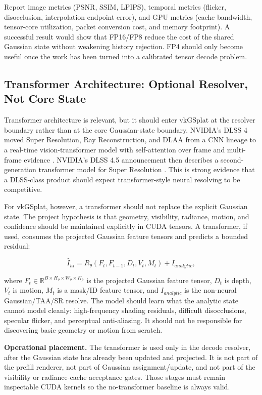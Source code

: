 \documentclass[11pt]{article}
\begin{document}
Report image metrics (PSNR, SSIM, LPIPS), temporal metrics (flicker,
disocclusion, interpolation endpoint error), and GPU metrics (cache bandwidth,
tensor-core utilization, packet conversion cost, and memory footprint). A
successful result would show that FP16/FP8 reduce the cost of the shared
Gaussian state without weakening history rejection. FP4 should only become
useful once the work has been turned into a calibrated tensor decode problem.

\subsection{Transformer Architecture: Optional Resolver, Not Core State}

Transformer architecture is relevant, but it should enter vkGSplat at the
resolver boundary rather than at the core Gaussian-state boundary. NVIDIA's
DLSS 4 moved Super Resolution, Ray Reconstruction, and DLAA from a CNN lineage
to a real-time vision-transformer model with self-attention over frame and
multi-frame evidence \cite{nvidia2025dlss4}. NVIDIA's DLSS 4.5 announcement
then describes a second-generation transformer model for Super Resolution
\cite{nvidia2026dlss45,nvidia2026dlssdeveloper}. This is strong evidence that
a DLSS-class product should expect transformer-style neural resolving to be
competitive.

For vkGSplat, however, a transformer should not replace the explicit Gaussian
state. The project hypothesis is that geometry, visibility, radiance, motion,
and confidence should be maintained explicitly in CUDA tensors. A transformer,
if used, consumes the projected Gaussian feature tensors and predicts a bounded
residual:

\[
  \hat I_{hi} = R_\theta(F_t, F_{t-1}, D_t, V_t, M_t) + I_{analytic},
\]

where $F_t\in\mathbb{R}^{B\times H_o\times W_o\times K_p}$ is the projected
Gaussian feature tensor, $D_t$ is depth, $V_t$ is motion, $M_t$ is a mask/ID
feature tensor, and $I_{analytic}$ is the non-neural Gaussian/TAA/SR resolve.
The model should learn what the analytic state cannot model cleanly:
high-frequency shading residuals, difficult disocclusions, specular flicker,
and perceptual anti-aliasing. It should not be responsible for discovering
basic geometry or motion from scratch.

\textbf{Operational placement.} The transformer is used only in the decode
resolver, after the Gaussian state has already been updated and projected. It
is not part of the prefill renderer, not part of Gaussian assignment/update, and
not part of the visibility or radiance-cache acceptance gates. Those stages
must remain inspectable CUDA kernels so the no-transformer baseline is always
valid.
\end{document}
